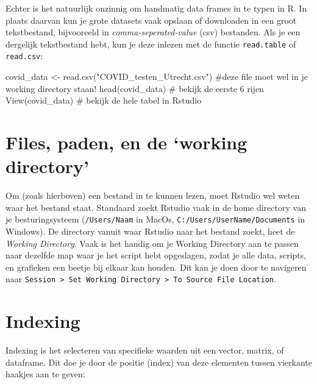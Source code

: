 \documentclass[
  b5paper,
  DIV=11,
  numbers=noendperiod]{scrreprt}
\newenvironment{Shaded}{\begin{snugshade}}{\end{snugshade}}
\newcommand{\CommentTok}[1]{\textcolor[rgb]{0.37,0.37,0.37}{#1}}
\newcommand{\FunctionTok}[1]{\textcolor[rgb]{0.28,0.35,0.67}{#1}}
\newcommand{\NormalTok}[1]{\textcolor[rgb]{0.00,0.23,0.31}{#1}}
\newcommand{\OtherTok}[1]{\textcolor[rgb]{0.00,0.23,0.31}{#1}}
\newcommand{\StringTok}[1]{\textcolor[rgb]{0.13,0.47,0.30}{#1}}
\theoremstyle{definition}
\theoremstyle{remark}
\begin{document}
Echter is het natuurlijk onzinnig om handmatig data frames in te typen
in R. In plaats daarvan kun je grote datasets vaak opslaan of downloaden
in een groot tekstbestand, bijvooreeld in \emph{comma-seperated-value}
(csv) bestanden. Als je een dergelijk tekstbestand hebt, kun je deze
inlezen met de functie \texttt{read.table} of \texttt{read.csv}:

\begin{Shaded}
\begin{Highlighting}[]
\NormalTok{covid\_data }\OtherTok{\textless{}{-}} \FunctionTok{read.csv}\NormalTok{(}\StringTok{"COVID\_testen\_Utrecht.csv"}\NormalTok{) }\CommentTok{\#deze file moet wel in je working directory staan!}
\FunctionTok{head}\NormalTok{(covid\_data) }\CommentTok{\# bekijk de eerste 6 rijen}
\FunctionTok{View}\NormalTok{(covid\_data) }\CommentTok{\# bekijk de hele tabel in Rstudio}
\end{Highlighting}
\end{Shaded}

\section{Files, paden, en de `working
directory'}\label{files-paden-en-de-working-directory}

Om (zoals hierboven) een bestand in te kunnen lezen, moet Rstudio wel
weten waar het bestand staat. Standaard zoekt Rstudio vaak in de home
directory van je besturingsysteem (\texttt{/Users/Naam} in MacOs,
\texttt{C:/Users/UserName/Documents} in Windows). De directory vanuit
waar Rstudio naar het bestand zoekt, heet de \emph{Working Directory}.
Vaak is het handig om je Working Directory aan te passen naar dezelfde
map waar je het script hebt opgeslagen, zodat je alle data, scripts, en
grafieken een beetje bij elkaar kan houden. Dit kan je doen door te
navigeren naar
\texttt{Session\ \textgreater{}\ Set\ Working\ Directory\ \textgreater{}\ To\ Source\ File\ Location}.

\section{Indexing}\label{indexing}

Indexing is het selecteren van specifieke waarden uit een vector,
matrix, of dataframe. Dit doe je door de positie (index) van deze
elementen tussen vierkante haakjes aan te geven:
\end{document}
